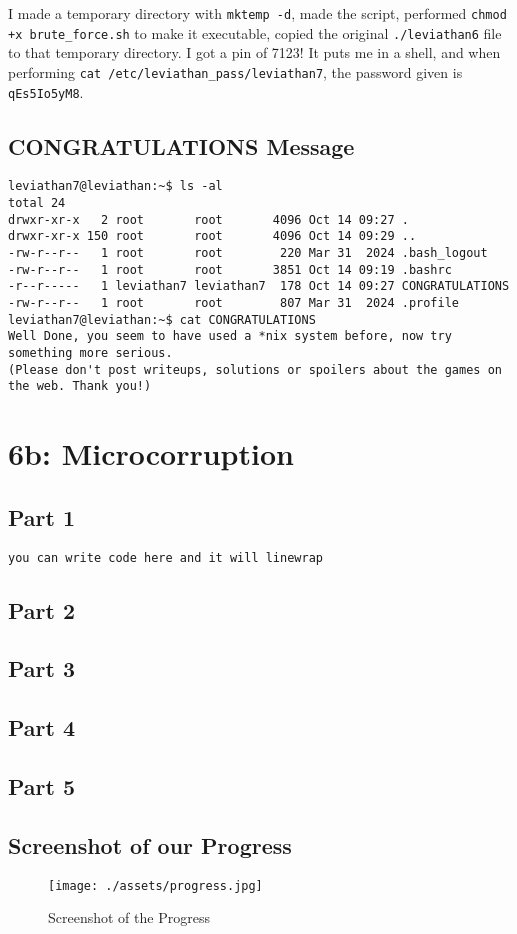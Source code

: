 \documentclass[11pt]{article}
\begin{document}
I made a temporary directory with \verb|mktemp -d|, made the script, performed \verb|chmod +x brute_force.sh| to make it executable, copied the original \verb|./leviathan6| file to that temporary directory. I got a pin of 7123! It puts me in a shell, and when performing \verb|cat /etc/leviathan_pass/leviathan7|, the password given is \verb|qEs5Io5yM8|.


\subsection*{CONGRATULATIONS Message}
\begin{lstlisting}
leviathan7@leviathan:~$ ls -al
total 24
drwxr-xr-x   2 root       root       4096 Oct 14 09:27 .
drwxr-xr-x 150 root       root       4096 Oct 14 09:29 ..
-rw-r--r--   1 root       root        220 Mar 31  2024 .bash_logout
-rw-r--r--   1 root       root       3851 Oct 14 09:19 .bashrc
-r--r-----   1 leviathan7 leviathan7  178 Oct 14 09:27 CONGRATULATIONS
-rw-r--r--   1 root       root        807 Mar 31  2024 .profile
leviathan7@leviathan:~$ cat CONGRATULATIONS
Well Done, you seem to have used a *nix system before, now try something more serious.
(Please don't post writeups, solutions or spoilers about the games on the web. Thank you!)
\end{lstlisting}

\section*{6b: Microcorruption}
\subsection*{Part 1}

\begin{lstlisting}
you can write code here and it will linewrap
\end{lstlisting}

\subsection*{Part 2}
\subsection*{Part 3}
\subsection*{Part 4}
\subsection*{Part 5}

\subsection*{Screenshot of our Progress}
\begin{figure}[!ht]
	\centering
	\texttt{[image: ./assets/progress.jpg]}
	\caption{Screenshot of the Progress}
	\label{fig:progress}
\end{figure}
\end{document}
